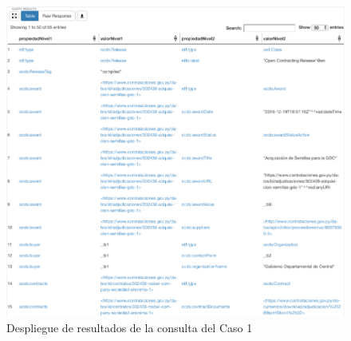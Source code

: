 \begin{figure}[ht!]
    \centering
    \includegraphics[width=150mm]{figuras/caso1Resultado.png}
    \caption{Despliegue de resultados de la consulta del Caso 1}
    \label{img:caso1Resultado}
 \end{figure}
